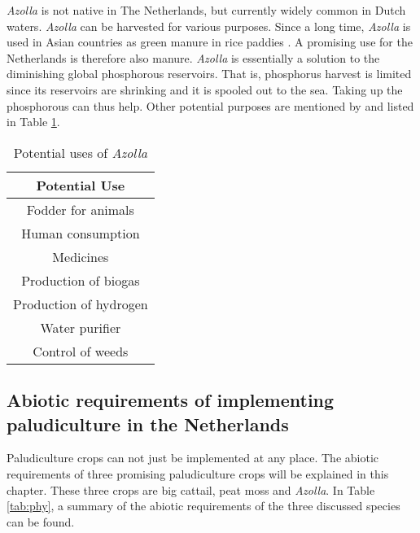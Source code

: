 \documentclass[12pt,a4paper,titlepage]{article}
\begin{document}
\textit{Azolla} is not native in The Netherlands, but currently widely common in Dutch waters. \textit{Azolla} can be harvested for various purposes. Since a long time, \textit{Azolla} is used in Asian countries as green manure in rice paddies \citep{wagner1997azolla}. A promising use for the Netherlands is therefore also manure. \textit{Azolla} is essentially a solution to the diminishing global phosphorous reservoirs. That is, phosphorus harvest is limited since its reservoirs are shrinking and it is spooled out to the sea. Taking up the phosphorous can thus help. Other potential purposes are mentioned by \citet{wagner1997azolla} and listed in Table \ref{tab:azolla}.

\begin{table}
\centering
\caption{Potential uses of \textit{Azolla}}
\begin{tabular}{|c|}
\hline 
\textbf{Potential Use} \\ 
\hline 
Fodder for animals \\ 
\hline 
Human consumption \\ 
\hline 
Medicines \\ 
\hline 
Production of biogas \\ 
\hline 
Production of hydrogen \\ 
\hline 
Water purifier \\ 
\hline 
Control of weeds \\ 
\hline 
\end{tabular} 
\label{tab:azolla}
\end{table}

\subsection{Abiotic requirements of  implementing paludiculture in the Netherlands}

Paludiculture crops can not just be implemented at any place. The abiotic requirements of three promising paludiculture crops will be explained in this chapter. These three crops are big cattail, peat moss and \textit{Azolla}. In Table \ref{tab:phy}, a summary of the abiotic requirements of the three discussed species can be found. 
\end{document}
